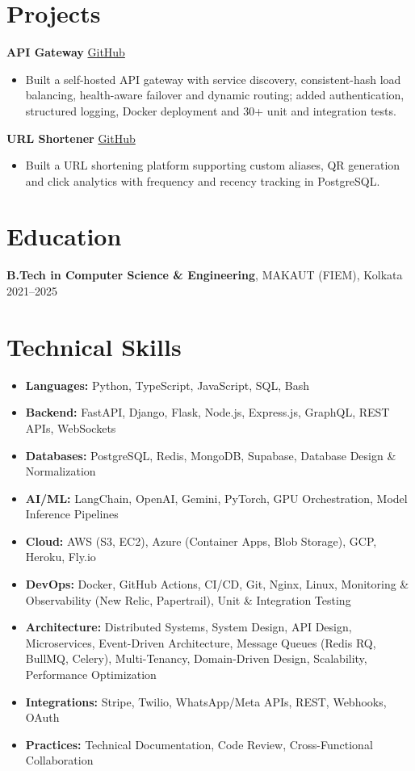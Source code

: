 \documentclass[10pt,a4paper]{article}
\newcommand{\project}[2]{
    \vspace{0.25em}
    \noindent\textbf{#1} \hfill \href{#2}{GitHub}\par
    \vspace{0.1em}
}
\begin{document}
\section*{Projects}

\project
{API Gateway}
{https://github.com/KausTarafdar/Arbitor}

\begin{itemize}[leftmargin=*,nosep]
\item Built a self-hosted API gateway with service discovery, consistent-hash load balancing, health-aware failover and dynamic routing; added authentication, structured logging, Docker deployment and 30+ unit and integration tests.
\end{itemize}

\project
{URL Shortener}
{https://github.com/KausTarafdar/pocket-url}

\begin{itemize}[leftmargin=*,nosep]
\item Built a URL shortening platform supporting custom aliases, QR generation and click analytics with frequency and recency tracking in PostgreSQL.
\end{itemize}

\section*{Education}
\noindent\textbf{B.Tech in Computer Science \& Engineering}, MAKAUT (FIEM), Kolkata \hfill 2021--2025

\section*{Technical Skills}
\begin{itemize}[leftmargin=*,nosep]
\item \textbf{Languages:} Python, TypeScript, JavaScript, SQL, Bash
\item \textbf{Backend:} FastAPI, Django, Flask, Node.js, Express.js, GraphQL, REST APIs, WebSockets
\item \textbf{Databases:} PostgreSQL, Redis, MongoDB, Supabase, Database Design \& Normalization
\item \textbf{AI/ML:} LangChain, OpenAI, Gemini, PyTorch, GPU Orchestration, Model Inference Pipelines
\item \textbf{Cloud:} AWS (S3, EC2), Azure (Container Apps, Blob Storage), GCP, Heroku, Fly.io
\item \textbf{DevOps:} Docker, GitHub Actions, CI/CD, Git, Nginx, Linux, Monitoring \& Observability (New Relic, Papertrail), Unit \& Integration Testing
\item \textbf{Architecture:} Distributed Systems, System Design, API Design, Microservices, Event-Driven Architecture, Message Queues (Redis RQ, BullMQ, Celery), Multi-Tenancy, Domain-Driven Design, Scalability, Performance Optimization
\item \textbf{Integrations:} Stripe, Twilio, WhatsApp/Meta APIs, REST, Webhooks, OAuth
\item \textbf{Practices:} Technical Documentation, Code Review, Cross-Functional Collaboration
\end{itemize}
\end{document}
